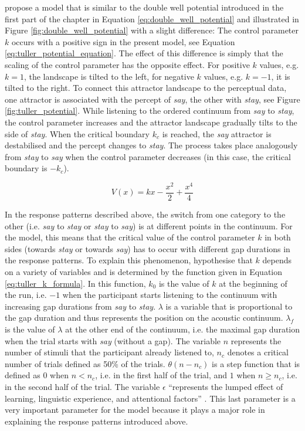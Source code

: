 \citet{Tulleretal1994} propose a model that is similar to the double well potential introduced in the first part of the chapter in Equation \ref{eq:double_well_potential} and illustrated in Figure \ref{fig:double_well_potential} with a slight difference: The control parameter $k$ occurs with a positive sign in the present model, see Equation \ref{eq:tuller_potential_equation}. The effect of this difference is simply that the scaling of the control parameter has the opposite effect. For positive $k$ values, e.g. $k = 1$, the landscape is tilted to the left, for negative $k$ values, e.g. $k = -1$, it is tilted to the right. 
To connect this attractor landscape to the perceptual data, one attractor is associated with the percept of \emph{say}, the other with \emph{stay}, see Figure \ref{fig:tuller_potential}. While listening to the ordered continuum from \emph{say} to \emph{stay}, the control parameter increases and the attractor landscape gradually tilts to the side of \emph{stay}. When the critical boundary $k_c$ is reached, the \emph{say} attractor is destabilised and the percept changes to \emph{stay}. The process takes place analogously from \emph{stay} to \emph{say} when the control parameter decreases (in this case, the critical boundary is $-k_c$).



\begin{equation}
V(x) = kx - \frac{x^2}{2} + \frac{x^4}{4}
\label{eq:tuller_potential_equation}
\end{equation}


In the response patterns described above, the switch from one category to the other (i.e. \emph{say} to \emph{stay} or \emph{stay} to \emph{say}) is at different points in the continuum. For the model, this means that the critical value of the control parameter $k$ in both sides (towards \emph{stay} or towards \emph{say}) has to occur with different gap durations in the response patterns. To explain this phenomenon, \citet{Tulleretal1994} hypothesise that $k$ depends on a variety of variables and is determined by the function given in Equation \ref{eq:tuller_k_formula}. In this function, $k_0$ is the value of $k$ at the beginning of the run, i.e. $-1$ when the participant starts listening to the continuum with increasing gap durations from \emph{say} to \emph{stay}. $\lambda$ is a variable that is proportional to the gap duration and thus represents the position on the acoustic continuum. $\lambda_f$ is the value of $\lambda$ at the other end of the continuum, i.e. the maximal gap duration when the trial starts with \emph{say} (without a gap). The variable $n$ represents the number of stimuli that the participant already listened to, $n_c$ denotes a critical number of trials defined as 50\% of the trials. $\theta(n-n_c)$ is a step function that is defined as $0$ when $n < n_c$, i.e. in the first half of the trial, and $1$ when $n \geq n_c$, i.e. in the second half of the trial. The variable $\epsilon$ ``represents the lumped effect of learning, linguistic experience, and attentional factors” \citep[8]{Tulleretal1994}. This last parameter is a very important parameter for the model because it plays a major role in explaining the response patterns introduced above.

